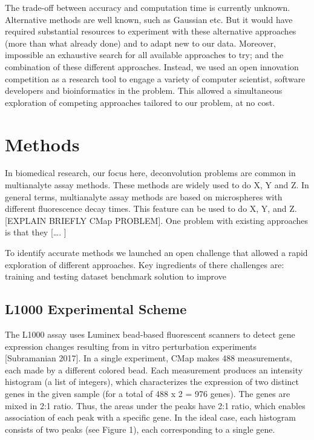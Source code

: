 \documentclass[]{article}
\begin{document}
The trade-off between accuracy and computation time is currently
unknown. Alternative methods are well known, such as Gaussian etc. But
it would have required substantial resources to experiment with these
alternative approaches (more than what already done) and to adapt new to
our data. Moreover, impossible an exhaustive search for all available
approaches to try; and the combination of these different approaches.
Instead, we used an open innovation competition as a research tool to
engage a variety of computer scientist, software developers and
bioinformatics in the problem. This allowed a simultaneous exploration
of competing approaches tailored to our problem, at no cost.

\hypertarget{methods}{%
\section{Methods}\label{methods}}

In biomedical research, our focus here, deconvolution problems are
common in multianalyte assay methods. These methods are widely used to
do X, Y and Z. In general terms, multianalyte assay methods are based on
microspheres with different fluorescence decay times. This feature can
be used to do X, Y, and Z. {[}EXPLAIN BRIEFLY CMap PROBLEM{]}. One
problem with existing approaches is that they {[}\ldots. {]}

To identify accurate methods we launched an open challenge that allowed
a rapid exploration of different approaches. Key ingredients of there
challenges are: training and testing dataset benchmark solution to
improve

\hypertarget{l1000-experimental-scheme}{%
\subsection{L1000 Experimental Scheme}\label{l1000-experimental-scheme}}

The L1000 assay uses Luminex bead-based fluorescent scanners to detect
gene expression changes resulting from in vitro perturbation experiments
{[}Subramanian 2017{]}. In a single experiment, CMap makes 488
measurements, each made by a different colored bead. Each measurement
produces an intensity histogram (a list of integers), which
characterizes the expression of two distinct genes in the given sample
(for a total of 488 x 2 = 976 genes). The genes are mixed in 2:1 ratio.
Thus, the areas under the peaks have 2:1 ratio, which enables
association of each peak with a specific gene. In the ideal case, each
histogram consists of two peaks (see Figure 1), each corresponding to a
single gene.
\end{document}
